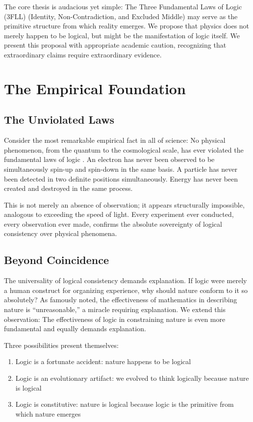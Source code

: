 \documentclass[12pt,a4paper]{article}
\begin{document}
The core thesis is audacious yet simple: The Three Fundamental Laws of Logic (3FLL) (Identity, Non-Contradiction, and Excluded Middle) may serve as the primitive structure from which reality emerges. We propose that physics does not merely happen to be logical, but might be the manifestation of logic itself. We present this proposal with appropriate academic caution, recognizing that extraordinary claims require extraordinary evidence.

\section{The Empirical Foundation}

\subsection{The Unviolated Laws}

Consider the most remarkable empirical fact in all of science: No physical phenomenon, from the quantum to the cosmological scale, has ever violated the fundamental laws of logic \citep{aristotle_metaphysics}. An electron has never been observed to be simultaneously spin-up and spin-down in the same basis. A particle has never been detected in two definite positions simultaneously. Energy has never been created and destroyed in the same process.

This is not merely an absence of observation; it appears structurally impossible, analogous to exceeding the speed of light. Every experiment ever conducted, every observation ever made, confirms the absolute sovereignty of logical consistency over physical phenomena.

\subsection{Beyond Coincidence}

The universality of logical consistency demands explanation. If logic were merely a human construct for organizing experience, why should nature conform to it so absolutely? As \citet{wigner1960unreasonable} famously noted, the effectiveness of mathematics in describing nature is ``unreasonable,'' a miracle requiring explanation. We extend this observation: The effectiveness of logic in constraining nature is even more fundamental and equally demands explanation.

Three possibilities present themselves:
\begin{enumerate}
\item Logic is a fortunate accident: nature happens to be logical
\item Logic is an evolutionary artifact: we evolved to think logically because nature is logical
\item Logic is constitutive: nature is logical because logic is the primitive from which nature emerges
\end{enumerate}
\end{document}
